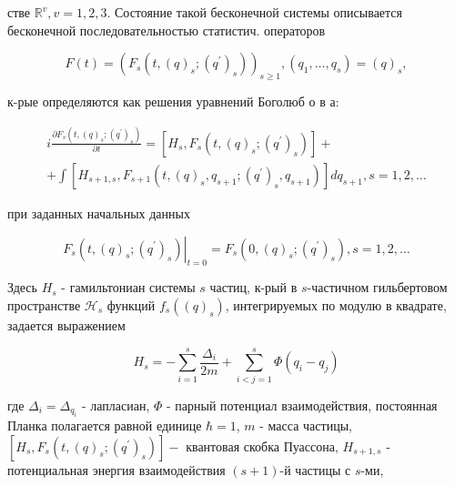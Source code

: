 \documentclass[10pt]{article}
\begin{document}
стве $\mathbb{R}^{v}, v=1,2,3$. Состояние такой бесконечной системы описывается бесконечной последовательностью статистич. операторов



\[

F(t)=\left(F_{s}\left(t,(q)_{s} ;\left(q^{\prime}\right)_{s}\right)\right)_{s \geqslant 1},\left(q_{1}, \ldots, q_{s}\right)=(q)_{s},

\]



к-рые определяются как решения уравнений Боголюб о в а:



\[

\begin{gathered}

i \frac{\partial F_{s}\left(t,(q)_{s} ;\left(q^{\prime}\right)_{s}\right)}{\partial t}=\left[H_{s}, F_{s}\left(t,(q)_{s} ;\left(q^{\prime}\right)_{s}\right)\right]+ \\

+\int\left[H_{s+1, s}, F_{s+1}\left(t,(q)_{s}, q_{s+1} ;\left(q^{\prime}\right)_{s}, q_{s+1}\right)\right] d q_{s+1}, s=1,2, \ldots

\end{gathered}

\]



при заданных начальных данных



\[

\left.F_{s}\left(t,(q)_{s} ;\left(q^{\prime}\right)_{s}\right)\right|_{t=0}=F_{s}\left(0,(q)_{s} ;\left(q^{\prime}\right)_{s}\right), s=1,2, \ldots

\]



Здесь $H_{s}$ - гамильтониан системы $s$ частиц, к-рый в $s$-частичном гильбертовом пространстве $\mathscr{H}_{s}$ функций $f_{s}\left((q)_{s}\right)$, интегрируемых по модулю в квадрате, задается выражением



\[

H_{s}=-\sum_{i=1}^{s} \frac{\Delta_{i}}{2 m}+\sum_{i<j=1}^{s} \Phi\left(q_{i}-q_{j}\right)

\]



где $\Delta_{i}=\Delta_{q_{i}}$ - лапласиан, $\Phi$ - парный потенциал взаимодействия, постоянная Планка полагается равной единице $\hbar=1$, $m$ - масса частицы, $\left[H_{s}, F_{s}\left(t,(q)_{s} ;\left(q^{\prime}\right)_{s}\right)\right]-$ квантовая скобка Пуассона, $H_{s+1, s}$ - потенциальная энергия взаимодействия $(s+1)$-й частицы с $s$-ми,
\end{document}
